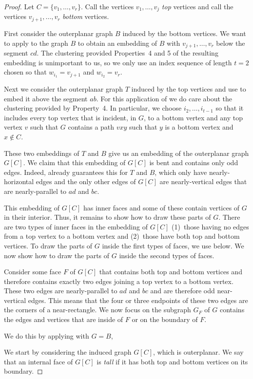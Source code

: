 \documentclass{patmorin}
\begin{document}
\begin{proof}
  Let $C=\{v_1,\ldots,v_r\}$. Call the vertices $v_1,\ldots,v_j$ \emph{top} vertices and call the vertices $v_{j+1},\ldots,v_r$ \emph{bottom} vertices.

  First consider the outerplanar graph $B$ induced by the bottom
  vertices. We want to apply  to the graph
  $B$ to obtain an embedding of $B$ with $v_{j+1},\ldots,v_{r}$
  below the segment $cd$.  The clustering provided Properties~4 and
  5 of the resulting embedding is unimportant to us, so we only use
  an index sequence of length $t=2$ chosen so that $w_{i_1}=v_{j+1}$
  and $w_{i_2}=v_r$.

  Next we consider the outerplanar graph $T$ induced by the top vertices
  and use  to embed it above the segment $ab$.
  For this application of  we do care about
  the clustering provided by Property~4. In particular, we choose
  $i_2,\ldots,i_{t-1}$ so that it includes every top vertex that is 
  incident, in $G$, to a bottom vertex and any top vertex $v$ such that $G$
  contains a path $vxy$ such that $y$ is a bottom vertex and $x\not\in C$.

  These two embeddings of $T$ and $B$ give us an embedding of the
  outerplanar graph $G[C]$.  We claim that this embedding of $G[C]$ is
  bent and contains only odd edges.  Indeed, 
  already guarantees this for
  $T$ and $B$, which only have nearly-horizontal edges and the only other
  edges of $G[C]$ are nearly-vertical edges that are nearly-parallel to
  $ad$ and $bc$.

  This embedding of $G[C]$ has inner faces and some of these contain
  vertices of $G$ in their interior. Thus, it remains to show how to
  draw these parts of $G$.  There are two types of inner faces in the
  embedding of $G[C]$ (1)~those having no edges from a top vertex to
  a bottom vertex and (2)~those have both top and bottom vertices.
  To draw the parts of $G$ inside the first types of faces, we use
   below. We now show how to draw the parts of $G$
  inside the second types of faces.

  Consider some face $F$ of $G[C]$ that contains both top and bottom
  vertices and therefore contains exactly two edges joining a top vertex
  to a bottom vertex. These two edges are nearly-parallel to $ad$ and $bc$
  and are therefore odd near-vertical edges.  This means that the four or
  three endpoints of these two edges are the corners of a near-rectangle.
  We now focus on the subgraph $G_F$ of $G$ contains the edges and
  vertices that are inside of $F$ or on the boundary of $F$.
  

We do this by applying  with $G=B$, 

  We start by considering the induced graph $G[C]$, which is outerplanar.
  We say that an internal face of $G[C]$ is \emph{tall} if it has both
  top and bottom vertices on its boundary. 

\end{proof}
\end{document}
